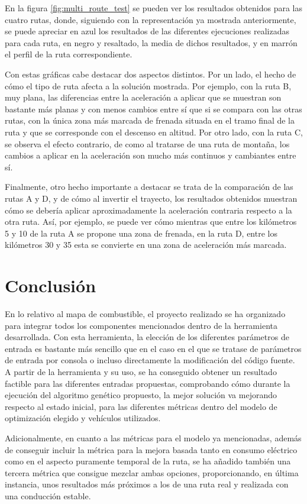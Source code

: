 \documentclass[11pt,spanish,listoffigures,listoftables]{tfgetsinf}
\begin{document}
En la figura \ref{fig:multi_route_test} se pueden ver los resultados obtenidos para las cuatro rutas, donde, siguiendo con la representación ya mostrada anteriormente, se puede apreciar en azul los resultados de las diferentes ejecuciones realizadas para cada ruta, en negro y resaltado, la media de dichos resultados, y en marrón el perfil de la ruta correspondiente.

Con estas gráficas cabe destacar dos aspectos distintos. Por un lado, el hecho de cómo el tipo de ruta afecta a la solución mostrada. Por ejemplo, con la ruta B, muy plana, las diferencias entre la aceleración a aplicar que se muestran son bastante más planas y con menos cambios entre sí que si se compara con las otras rutas, con la única zona más marcada de frenada situada en el tramo final de la ruta y que se corresponde con el descenso en altitud. Por otro lado, con la ruta C, se observa el efecto contrario, de como al tratarse de una ruta de montaña, los cambios a aplicar en la aceleración son mucho más continuos y cambiantes entre sí.

Finalmente, otro hecho importante a destacar se trata de la comparación de las rutas A y D, y de cómo al invertir el trayecto, los resultados obtenidos muestran cómo se debería aplicar aproximadamente la aceleración contraria respecto a la otra ruta. Así, por ejemplo, se puede ver cómo mientras que entre los kilómetros 5 y 10 de la ruta A se propone una zona de frenada, en la ruta D, entre los kilómetros 30 y 35 esta se convierte en una zona de aceleración más marcada.

\chapter{Conclusión}
En lo relativo al mapa de combustible, el proyecto realizado se ha organizado para integrar todos los componentes mencionados dentro de la herramienta desarrollada. Con esta herramienta, la elección de los diferentes parámetros de entrada es bastante más sencillo que en el caso en el que se tratase de parámetros de entrada por consola o incluso directamente la modificación del código fuente. A partir de la herramienta y su uso, se ha conseguido obtener un resultado factible para las diferentes entradas propuestas, comprobando cómo durante la ejecución del algoritmo genético propuesto, la mejor solución va mejorando respecto al estado inicial, para las diferentes métricas dentro del modelo de optimización elegido y vehículos utilizados.

Adicionalmente, en cuanto a las métricas para el modelo ya mencionadas, además de conseguir incluir la métrica para la mejora basada tanto en consumo eléctrico como en el aspecto puramente temporal de la ruta, se ha añadido también una tercera métrica que consigue mezclar ambas opciones, proporcionando, en última instancia, unos resultados más próximos a los de una ruta real y realizada con una conducción estable.
\end{document}
